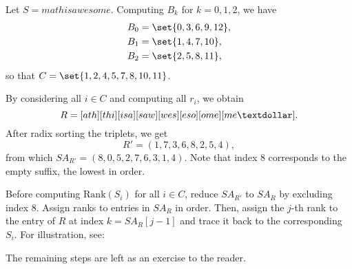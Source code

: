 \documentclass{subfiles}
\begin{document}
    \begin{example*}
        Let \(S = mathisawesome\). Computing \(B_{k}\) for \(k = 0, 1, 2\), we have
        \[
        \begin{aligned}
            B_{0} &= \set{0, 3, 6, 9, 12}, \\
            B_{1} &= \set{1, 4, 7, 10}, \\
            B_{2} &= \set{2, 5, 8, 11},
        \end{aligned}
        \]
        so that \(C = \set{1, 2, 4, 5, 7, 8, 10, 11}\).

        By considering all \(i \in C\) and computing all \(r_{i}\), we obtain
        \[
            R = [ath][thi][isa][saw][wes][eso][ome][me\textdollar].
        \]
        After radix sorting the triplets, we get
        \[
            R' = (1, 7, 3, 6, 8, 2, 5, 4),
        \]
        from which \(SA_{R'} = (8, 0, 5, 2, 7, 6, 3, 1, 4)\). Note that index 8 
        corresponds to the empty suffix, the lowest in order.

        Before computing \(\mathrm{Rank}(S_{i})\) for all \(i \in C\), reduce 
        \(SA_{R'}\) to \(SA_{R}\) by excluding index 8. Assign ranks to entries 
        in \(SA_{R}\) in order. Then, assign the \(j\)-th rank to the entry of 
        \(R\) at index \(k = SA_{R}[j - 1]\) and trace it back to the corresponding 
        \(S_{i}\). For illustration, see:
        

        The remaining steps are left as an exercise to the reader.
    \end{example*}
    \cleardoublepage
\end{document}
